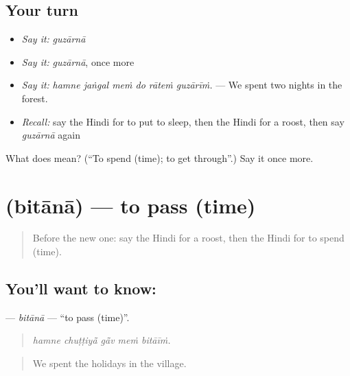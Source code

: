 \subsection*{Your turn}
\begin{itemize}
\raggedright
  \item \emph{Say it:} \emph{guzārnā}
  \item \emph{Say it:} \emph{guzārnā}, once more
  \item \emph{Say it:} \emph{hamne jaṅgal meṁ do rāteṁ guzārīṁ.} — We spent two nights in the forest.
  \item \emph{Recall:} say the Hindi for to put to sleep, then the Hindi for a roost, then say \emph{guzārnā} again
\end{itemize}

\begin{tcolorbox}[breakable,colback=teal!4,colframe=teal!35!black,title={Before you move on}]
What does  mean? (\textquotedblleft{}To spend (time); to get through\textquotedblright{}.) Say it once more.
\end{tcolorbox}
\section[\texorpdfstring{\hi{बिताना} (bitānā)}{बिताना (bitānā)}]{ (bitānā) — to pass (time)}

\label{lesson:HI-C416-bitana}



\begin{quote}
Before the new one: say the Hindi for a roost, then the Hindi for to spend (time).
\end{quote}

\subsection*{You'll want to know: }
\textbf{} — \emph{bitānā} — \textquotedblleft{}to pass (time)\textquotedblright{}.

\begin{quote}
    
\end{quote}

\begin{quote}
\emph{hamne chuṭṭiyā̃ gā̃v meṁ bitāīṁ.}
\end{quote}

\begin{quote}
We spent the holidays in the village.
\end{quote}

